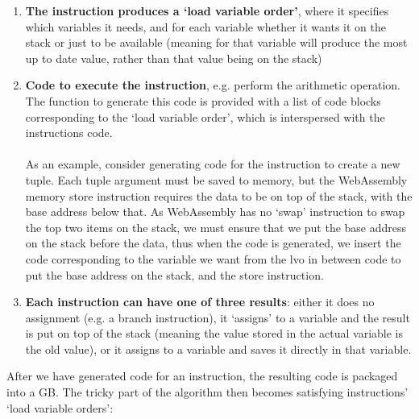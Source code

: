 \begin{enumerate}
\item \textbf{The instruction produces a `load variable order'}, where it specifies which variables it needs, and for each variable whether it wants it on the stack or just to be available (meaning  for that variable will produce the most up to date value, rather than that value being on the stack)

\item \textbf{Code to execute the instruction}, e.g. perform the arithmetic operation. The function to generate this code is provided with a list of code blocks corresponding to the `load variable order', which is interspersed with the instructions code.
\\\\
As an example, consider generating code for the instruction to create a new tuple. Each tuple argument must be saved to memory, but the WebAssembly memory store instruction  requires the data to be on top of the stack, with the base address below that. As WebAssembly has no `swap' instruction to swap the top two items on the stack, we must ensure that we put the base address on the stack before the data, thus when the code is generated, we insert the code corresponding to the variable we want from the lvo in between code to put the base address on the stack, and the store instruction.

\item \textbf{Each instruction can have one of three results}: either it does no assignment (e.g. a branch instruction), it `assigns' to a variable and the result is put on top of the stack (meaning the value stored in the actual variable is the old value), or it assigns to a variable and saves it directly in that variable.
\end{enumerate}
After we have generated code for an instruction, the resulting code is packaged into a GB. The tricky part of the algorithm then becomes satisfying instructions' `load variable orders':

